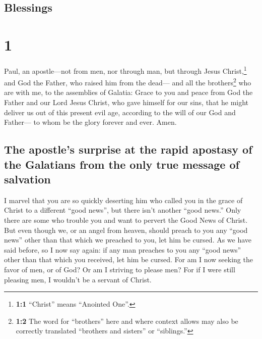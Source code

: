 \hypertarget{blessings}{%
\subsection{Blessings}\label{blessings}}

\hypertarget{section}{%
\section{1}\label{section}}

 Paul, an apostle---not from men, nor through man, but
through Jesus Christ,\footnote{\textbf{1:1} ``Christ'' means ``Anointed
  One''.} and God the Father, who raised him from the dead---
 and all the brothers\footnote{\textbf{1:2} The word for
  ``brothers'' here and where context allows may also be correctly
  translated ``brothers and sisters'' or ``siblings.''} who are with me,
to the assemblies of Galatia:  Grace to you and peace from
God the Father and our Lord Jesus Christ,  who gave
himself for our sins, that he might deliver us out of this present evil
age, according to the will of our God and Father---  to
whom be the glory forever and ever. Amen.

\hypertarget{the-apostles-surprise-at-the-rapid-apostasy-of-the-galatians-from-the-only-true-message-of-salvation}{%
\subsection{The apostle's surprise at the rapid apostasy of the
Galatians from the only true message of
salvation}\label{the-apostles-surprise-at-the-rapid-apostasy-of-the-galatians-from-the-only-true-message-of-salvation}}

 I marvel that you are so quickly deserting him who called
you in the grace of Christ to a different ``good news'', 
but there isn't another ``good news.'' Only there are some who trouble
you and want to pervert the Good News of Christ.  But even
though we, or an angel from heaven, should preach to you any ``good
news'' other than that which we preached to you, let him be cursed.
 As we have said before, so I now say again: if any man
preaches to you any ``good news'' other than that which you received,
let him be cursed.  For am I now seeking the favor of
men, or of God? Or am I striving to please men? For if I were still
pleasing men, I wouldn't be a servant of Christ.

